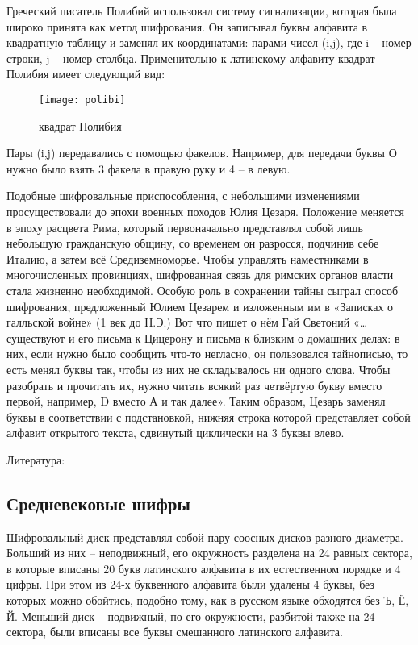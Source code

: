 Греческий писатель Полибий использовал систему сигнализации, которая была широко принята как метод шифрования. Он записывал буквы алфавита в квадратную таблицу и заменял их координатами: парами чисел (i,j), где i – номер строки, j – номер столбца. Применительно к латинскому алфавиту квадрат Полибия имеет следующий вид:

\begin{figure}[H]
	\texttt{[image: polibi]}
	\centering
	\caption{квадрат Полибия}
\end{figure}

Пары (i,j) передавались с помощью факелов. Например, для передачи буквы О нужно было взять 3 факела в правую руку и 4 – в левую.

Подобные шифровальные приспособления, с небольшими изменениями просуществовали до эпохи военных походов Юлия Цезаря. Положение меняется в эпоху расцвета Рима, который первоначально представлял собой лишь небольшую гражданскую общину, со временем он разросся, подчинив себе Италию, а затем всё Средиземноморье. Чтобы управлять наместниками в многочисленных провинциях, шифрованная связь для римских органов власти стала жизненно необходимой. Особую роль в сохранении тайны сыграл способ шифрования, предложенный Юлием Цезарем и изложенным им в «Записках о галльской войне» (1 век до Н.Э.) Вот что пишет о нём Гай Светоний «…существуют и его письма к Цицерону и письма к близким о домашних делах: в них, если нужно было сообщить что-то негласно, он пользовался тайнописью, то есть менял буквы так, чтобы из них не складывалось ни одного слова. Чтобы разобрать и прочитать их, нужно читать всякий раз четвёртую букву вместо первой, например, D вместо А и так далее». Таким образом, Цезарь заменял буквы в соответствии с подстановкой, нижняя строка которой представляет собой алфавит открытого текста, сдвинутый циклически на 3 буквы влево.



Литература: \cite{senthil2013modern}

\subsection{Средневековые шифры}

Шифровальный диск представлял собой пару соосных дисков разного диаметра. Больший из них – неподвижный, его окружность разделена на 24 равных сектора, в которые вписаны 20 букв латинского алфавита в их естественном порядке и 4 цифры. При этом из 24-х буквенного алфавита были удалены 4 буквы, без которых можно обойтись, подобно тому, как в русском языке обходятся без Ъ, Ё, Й. Меньший диск – подвижный, по его окружности, разбитой также на 24 сектора, были вписаны все буквы смешанного латинского алфавита.

